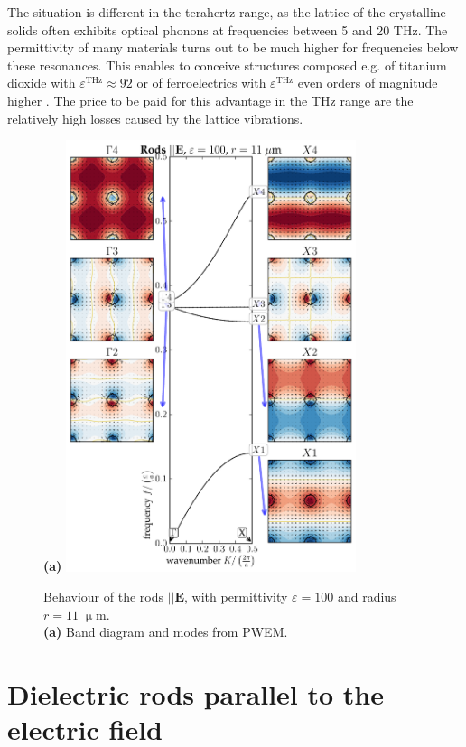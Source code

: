 {The situation is different in the terahertz range, as the lattice of the crystalline solids often exhibits optical phonons at frequencies between 5 and 20 THz. The permittivity of many materials turns out to be much higher for frequencies below these resonances. This enables to conceive structures composed e.g. of titanium dioxide \cite{baumard1977_epsilon_TiO2} with $\varepsilon^{\text{THz}} \approx 92$ or of ferroelectrics with $\varepsilon^{\text{THz}}$ even orders of magnitude higher \cite{skoromets2011tuning}. The price to be paid for this advantage in the THz range are the relatively high losses caused by the lattice vibrations.

\begin{figure}[ht] \caption{Behaviour of the rods $||\mathbf E$, with permittivity $\varepsilon = 100$ and radius $r=11\;\upmu$m.\\
\textbf{(a)} Band diagram and modes from PWEM. 
} \label{fg_erod_radius11} \centering 
\textbf{(a)}	\includegraphics[width=8.5cm]{img/ERods_eps100_R11_PWEM.pdf}
\end{figure}

}






\FloatBarrier %
\section{Dielectric rods parallel to the electric field} %

